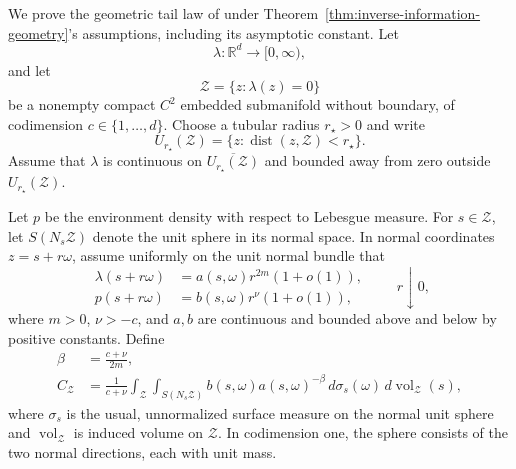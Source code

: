 We prove the geometric tail law of \citet{mansouri_arai_2026_fisher_glasses} under Theorem~\ref{thm:inverse-information-geometry}'s assumptions, including its asymptotic constant. Let
\[
\lambda:\mathbb R^d\longrightarrow[0,\infty),
\]
and let
\[
\mathcal Z=\{z:\lambda(z)=0\}
\]
be a nonempty compact \(C^2\) embedded submanifold without boundary, of codimension \(c\in\{1,\ldots,d\}\). Choose a tubular radius \(r_\star>0\) and write
\[
U_{r_\star}(\mathcal Z)
=
\{z:\operatorname{dist}(z,\mathcal Z)<r_\star\}.
\]
Assume that \(\lambda\) is continuous on \(\overline{U_{r_\star}(\mathcal Z)}\) and bounded away from zero outside \(U_{r_\star}(\mathcal Z)\).

Let \(p\) be the environment density with respect to Lebesgue measure. For \(s\in\mathcal Z\), let \(S(N_s\mathcal Z)\) denote the unit sphere in its normal space. In normal coordinates \(z=s+r\omega\), assume uniformly on the unit normal bundle that
\[
\begin{aligned}
\lambda(s+r\omega)
&=
a(s,\omega)r^{2m}(1+o(1)),
\\
p(s+r\omega)
&=
b(s,\omega)r^\nu(1+o(1)),
\end{aligned}
\qquad r\downarrow0,
\tag{A.7}\label{eq:null-set-expansions}
\]
where \(m>0\), \(\nu>-c\), and \(a,b\) are continuous and bounded above and below by positive constants. Define
\[
\begin{aligned}
\beta
&=
\frac{c+\nu}{2m},
\\
C_{\mathcal Z}
&=
\frac{1}{c+\nu}
\int_{\mathcal Z}
\int_{S(N_s\mathcal Z)}
b(s,\omega)a(s,\omega)^{-\beta}
\,d\sigma_s(\omega)\,
d\operatorname{vol}_{\mathcal Z}(s),
\end{aligned}
\tag{A.8}\label{eq:app-tail-constant}
\]
where \(\sigma_s\) is the usual, unnormalized surface measure on the normal unit sphere and \(\operatorname{vol}_{\mathcal Z}\) is induced volume on \(\mathcal Z\). In codimension one, the sphere consists of the two normal directions, each with unit mass.

